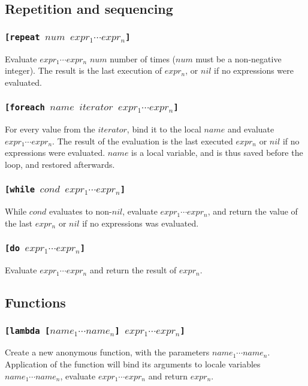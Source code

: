 \subsection{Repetition and sequencing}
\subsubsection{\tt{[repeat }$num$ $expr_1 \cdots expr_n$\tt{]}}
Evaluate $expr_1 \cdots expr_n$ $num$ number of times ($num$ must be a non-negative integer). The result is the last execution of $expr_n$, or $nil$ if no expressions were evaluated.

\subsubsection{\tt{[foreach }$name$ $iterator$ $expr_1 \cdots expr_n$\tt{]}}
For every value from the $iterator$, bind it to the local $name$ and evaluate $expr_1 \cdots expr_n$. The result of the evaluation is the last executed $expr_n$ or $nil$ if no expressions were evaluated. $name$ is a local variable, and is thus saved before the loop, and restored afterwards.

\subsubsection{\tt{[while }$cond$ $expr_1 \cdots expr_n$\tt{]}}
While $cond$ evaluates to non-$nil$, evaluate $expr_1 \cdots expr_n$, and return the value of the last $expr_n$ or $nil$ if no expressions was evaluated.


\subsubsection{\tt{[do }$expr_1 \cdots expr_n$\tt{]}}
Evaluate $expr_1 \cdots expr_n$ and return the result of $expr_n$.


\subsection{Functions}
\subsubsection{\tt{[lambda [}$name_1 \cdots name_n$\tt{]} $expr_1 \cdots expr_n$\tt{]}}
Create a new anonymous function, with the parameters $name_1\cdots name_n$. Application of the function will bind its arguments to locale variables $name_1\cdots name_n$, evaluate $expr_1\cdots expr_n$ and return $expr_n$.
